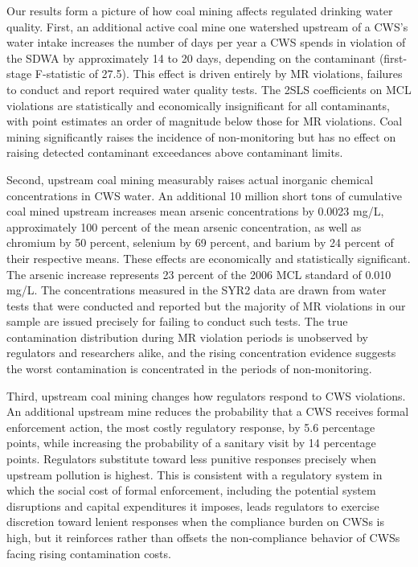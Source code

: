 \documentclass{article}
\begin{document}
Our results form a picture of how coal mining affects regulated drinking water quality. First, an additional active coal mine one watershed upstream of a CWS's water intake increases the number of days per year a CWS spends in violation of the SDWA by approximately 14 to 20 days, depending on the contaminant (first-stage F-statistic of 27.5). This effect is driven entirely by MR violations, failures to conduct and report required water quality tests. The 2SLS coefficients on MCL violations are statistically and economically insignificant for all contaminants, with point estimates an order of magnitude below those for MR violations. Coal mining significantly raises the incidence of non-monitoring but has no effect on raising detected contaminant exceedances above contaminant limits.

Second, upstream coal mining measurably raises actual inorganic chemical concentrations in CWS water. An additional 10 million short tons of cumulative coal mined upstream increases mean arsenic concentrations by 0.0023 mg/L, approximately 100 percent of the mean arsenic concentration, as well as chromium by 50 percent, selenium by 69 percent, and barium by 24 percent of their respective means. These effects are economically and statistically significant. The arsenic increase represents 23 percent of the 2006 MCL standard of 0.010 mg/L. The concentrations measured in the SYR2 data are drawn from water tests that were conducted and reported but the majority of MR violations in our sample are issued precisely for failing to conduct such tests. The true contamination distribution during MR violation periods is unobserved by regulators and researchers alike, and the rising concentration evidence suggests the worst contamination is concentrated in the periods of non-monitoring.

Third, upstream coal mining changes how regulators respond to CWS violations. An additional upstream mine reduces the probability that a CWS receives formal enforcement action, the most costly regulatory response, by 5.6 percentage points, while increasing the probability of a sanitary visit by 14 percentage points. Regulators substitute toward less punitive responses precisely when upstream pollution is highest. This is consistent with a regulatory system in which the social cost of formal enforcement, including the potential system disruptions and capital expenditures it imposes, leads regulators to exercise discretion toward lenient responses when the compliance burden on CWSs is high, but it reinforces rather than offsets the non-compliance behavior of CWSs facing rising contamination costs.
\end{document}
